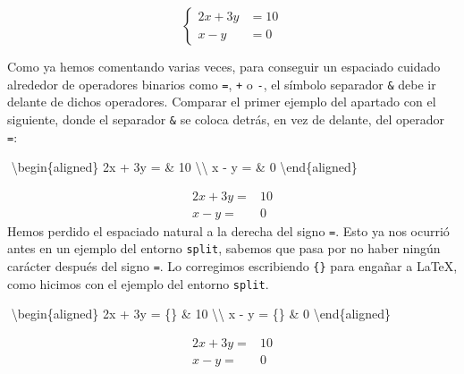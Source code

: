 \documentclass[
  letterpaper,
  DIV=11,
  numbers=noendperiod]{scrartcl}
\newenvironment{Shaded}{\begin{snugshade}}{\end{snugshade}}
\newcommand{\ExtensionTok}[1]{\textcolor[rgb]{0.00,0.23,0.31}{#1}}
\newcommand{\KeywordTok}[1]{\textcolor[rgb]{0.00,0.23,0.31}{#1}}
\newcommand{\NormalTok}[1]{\textcolor[rgb]{0.00,0.23,0.31}{#1}}
\newcommand{\SpecialCharTok}[1]{\textcolor[rgb]{0.37,0.37,0.37}{#1}}
\newcommand{\SpecialStringTok}[1]{\textcolor[rgb]{0.13,0.47,0.30}{#1}}
\begin{document}
\[
\left\{
\begin{aligned} 
2x + 3y & =  10 \\
  x - y & =  0 
\end{aligned}
\right.
\]

Como ya hemos comentando varias veces, para conseguir un espaciado
cuidado alrededor de operadores binarios como \texttt{=}, \texttt{+} o
\texttt{-}, el símbolo separador \texttt{\&} debe ir delante de dichos
operadores. Comparar el primer ejemplo del apartado con el siguiente,
donde el separador \texttt{\&} se coloca detrás, en vez de delante, del
operador \texttt{=}:

\begin{Shaded}
\begin{Highlighting}[]
\SpecialStringTok{$$}
\KeywordTok{\textbackslash{}begin}\NormalTok{\{}\ExtensionTok{aligned}\NormalTok{\}}\SpecialStringTok{ }
\SpecialStringTok{2x + 3y  = \& 10 }\SpecialCharTok{\textbackslash{}\textbackslash{}}
\SpecialStringTok{  x {-} y  = \& 0 }
\KeywordTok{\textbackslash{}end}\NormalTok{\{}\ExtensionTok{aligned}\NormalTok{\}}
\SpecialStringTok{$$}
\end{Highlighting}
\end{Shaded}

\[
\begin{aligned} 
2x + 3y  = & 10 \\
  x - y  = & 0 
\end{aligned}
\] Hemos perdido el espaciado natural a la derecha del signo \texttt{=}.
Esto ya nos ocurrió antes en un ejemplo del entorno \texttt{split},
sabemos que pasa por no haber ningún carácter después del signo
\texttt{=}. Lo corregimos escribiendo \texttt{\{\}} para engañar a
LaTeX, como hicimos con el ejemplo del entorno \texttt{split}.

\begin{Shaded}
\begin{Highlighting}[]
\SpecialStringTok{$$}
\KeywordTok{\textbackslash{}begin}\NormalTok{\{}\ExtensionTok{aligned}\NormalTok{\}}\SpecialStringTok{ }
\SpecialStringTok{2x + 3y  = \{\} \& 10 }\SpecialCharTok{\textbackslash{}\textbackslash{}}
\SpecialStringTok{  x {-} y  = \{\} \& 0 }
\KeywordTok{\textbackslash{}end}\NormalTok{\{}\ExtensionTok{aligned}\NormalTok{\}}
\SpecialStringTok{$$}
\end{Highlighting}
\end{Shaded}

\[
\begin{aligned} 
2x + 3y  = {} & 10 \\
  x - y  = {} & 0 
\end{aligned}
\]
\end{document}
